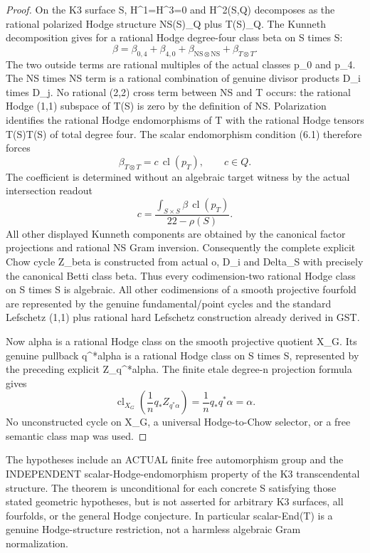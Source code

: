 \documentclass[11pt]{article}
\newcommand{\cl}{\operatorname{cl}}
\begin{document}
\begin{proof}
On the K3 surface S, H^1=H^3=0 and
H^2(S,Q) decomposes as the rational polarized
Hodge structure NS(S)_Q plus T(S)_Q.
The Kunneth decomposition gives for a rational
Hodge degree-four class beta on S times S:
\[
 \beta=\beta_{0,4}+\beta_{4,0}
                 +\beta_{\mathrm{NS}\otimes\mathrm{NS}}
                 +\beta_{T\otimes T}.
\]
The two outside terms are rational multiples of
the actual classes p_0 and p_4. The NS times NS
term is a rational combination of genuine
divisor products D_i times D_j.
No rational (2,2) cross term between NS and T
occurs: the rational Hodge (1,1) subspace of
T(S) is zero by the definition of NS.
Polarization identifies the rational Hodge
endomorphisms of T with the rational
Hodge tensors T(S)\otimes T(S) of total
degree four. The scalar endomorphism condition
(6.1) therefore forces
\[
       \beta_{T\otimes T}
                  =c\,\cl(p_T),\qquad c\in Q.
\]
The coefficient is determined without an
algebraic target witness by the actual
intersection readout
\[
 \boxed{c=\frac{\int_{S\times S}\beta\,\cl(p_T)}
                      {22-\rho(S)}.}              \tag{6.3}
\]
All other displayed Kunneth components are
obtained by the canonical factor projections
and rational NS Gram inversion. Consequently
the complete explicit Chow cycle
Z_beta is constructed from actual o, D_i and
Delta_S with precisely the canonical Betti
class beta. Thus every codimension-two rational
Hodge class on S times S is algebraic.
All other codimensions of a smooth projective
fourfold are represented by the genuine
fundamental/point cycles and the standard
Lefschetz (1,1) plus rational hard Lefschetz
construction already derived in GST.

Now alpha is a rational Hodge class on the
smooth projective quotient X_G. Its genuine
pullback q^*alpha is a rational Hodge class
on S times S, represented by the preceding
explicit Z_{q^*alpha}. The finite etale
degree-n projection formula gives
\[
 \cl_{X_G}\left(\frac1n q_* Z_{q^*\alpha}\right)
 =\frac1n q_* q^*\alpha=\alpha.
\]
No unconstructed cycle on X_G, a
universal Hodge-to-Chow selector, or
a free semantic class map was used.
\end{proof}

The hypotheses include an ACTUAL finite free
automorphism group and the INDEPENDENT
scalar-Hodge-endomorphism property of
the K3 transcendental structure.
The theorem is unconditional for each concrete
S satisfying those stated geometric hypotheses,
but is not asserted for arbitrary K3 surfaces,
all fourfolds, or the general Hodge conjecture.
In particular scalar-End(T) is a genuine
Hodge-structure restriction, not a harmless
algebraic Gram normalization.
\end{document}
